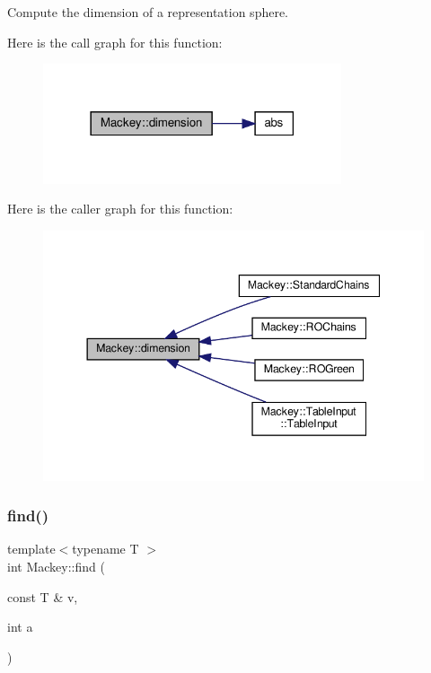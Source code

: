 Compute the dimension of a representation sphere. 

Here is the call graph for this function\+:\nopagebreak
\begin{figure}[H]
\begin{center}
\leavevmode
\includegraphics[width=249pt]{namespaceMackey_a6a5d40e69e5628ea84896ee43f4a91fa_cgraph}
\end{center}
\end{figure}
Here is the caller graph for this function\+:\nopagebreak
\begin{figure}[H]
\begin{center}
\leavevmode
\includegraphics[width=344pt]{namespaceMackey_a6a5d40e69e5628ea84896ee43f4a91fa_icgraph}
\end{center}
\end{figure}
\mbox{\label{namespaceMackey_a74984d054f1f943ab61dd0415347f141}} 
\subsubsection{\texorpdfstring{find()}{find()}}
{\footnotesize\ttfamily template$<$typename T $>$ \\
int Mackey\+::find (\begin{DoxyParamCaption}\item[{const T \&}]{v,  }\item[{int}]{a }\end{DoxyParamCaption})}



